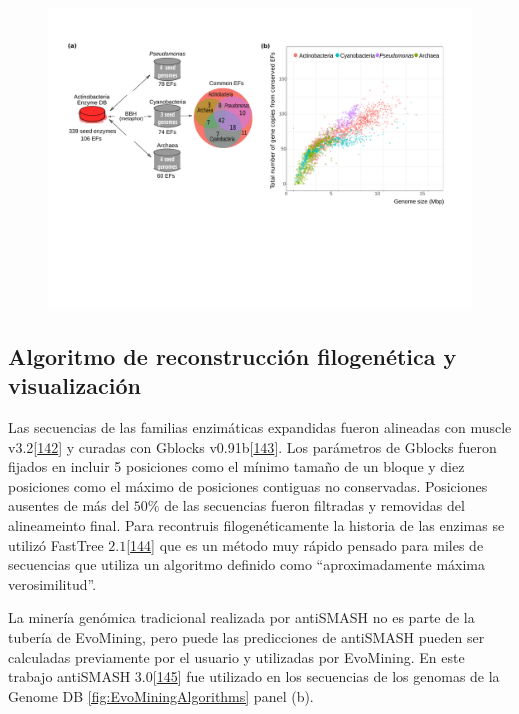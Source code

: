 \documentclass[12pt,twoside]{reedthesis}
\begin{document}
  \begin{figure}[h!tbp]
  \centering
  \includegraphics[angle = 0,scale = .6]{chapter2/FigurasPaper/Figure2.pdf}
  \caption[Seed genomes]{\footnotesize{}}
  \label{fig:SeedGenomes}
  \end{figure}
  
  \subsection{Algoritmo de reconstrucción filogenética y
  visualización}\label{algoritmo-de-reconstruccion-filogenetica-y-visualizacion}
  
  Las secuencias de las familias enzimáticas expandidas fueron alineadas
  con muscle v3.2{[}\protect\hyperlink{ref-edgar_muscle_2004}{142}{]} y
  curadas con Gblocks
  v0.91b{[}\protect\hyperlink{ref-castresana_selection_2000}{143}{]}. Los
  parámetros de Gblocks fueron fijados en incluir 5 posiciones como el
  mínimo tamaño de un bloque y diez posiciones como el máximo de
  posiciones contiguas no conservadas. Posiciones ausentes de más del
  \(50\%\) de las secuencias fueron filtradas y removidas del alineameinto
  final. Para recontruis filogenéticamente la historia de las enzimas se
  utilizó FastTree
  \(2.1\){[}\protect\hyperlink{ref-price_fasttree_2010}{144}{]} que es un
  método muy rápido pensado para miles de secuencias que utiliza un
  algoritmo definido como ``aproximadamente máxima verosimilitud''.
  
  La minería genómica tradicional realizada por antiSMASH no es parte de
  la tubería de EvoMining, pero puede las predicciones de antiSMASH pueden
  ser calculadas previamente por el usuario y utilizadas por EvoMining. En
  este trabajo antiSMASH
  3.0{[}\protect\hyperlink{ref-weber_antismash3_2015}{145}{]} fue
  utilizado en los secuencias de los genomas de la Genome DB
  \autoref{fig:EvoMiningAlgorithms} panel (b).
  
\end{document}
